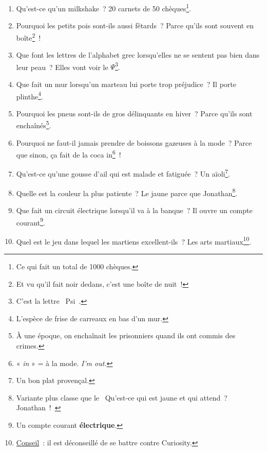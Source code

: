 \documentclass[10pt,a5paper,fullpage]{book}
\begin{document}
\begin{enumerate}
		\item Qu’est-ce qu'un milkshake~? 20 carnets de 50 chèques\footnote{Ce qui fait un total de 1000 chèques.}.
		\item Pourquoi les petits pois sont-ils aussi fêtards~? Parce qu'ils sont souvent en boîte\footnote{Et vu qu’il fait noir dedans, c’est une boîte de nuit~!}~!
		\item Que font les lettres de l’alphabet grec lorsqu’elles ne se sentent pas bien dans leur peau~? Elles vont voir le $\Psi$\footnote{C'est la lettre \guillemotleft~Psi~\guillemotright.}.
		\item Que fait un mur lorsqu’un marteau lui porte trop préjudice~? Il porte plinthe\footnote{L’espèce de frise de carreaux en bas d’un mur. }.
		\item Pourquoi les pneus sont-ils de gros délinquants en hiver~? Parce qu’ils sont enchaînés\footnote{À une époque, on enchaînait les prisonniers quand ils ont commis des crimes.}. 
		\item Pourquoi ne faut-il jamais prendre de boissons gazeuses à la mode~? Parce que sinon, ça fait de la coca in\footnote{« \textit{in} » = à la mode. \textit{I'm out.}}~!
		\item Qu’est-ce qu’une gousse d’ail qui est malade et fatiguée~? Un aïoli\footnote{Un bon plat provençal.}.
		\item Quelle est la couleur la plus patiente~? Le jaune parce que Jonathan\footnote{Variante plus classe que le \guillemotleft~Qu'est-ce qui est jaune et qui attend~? Jonathan~!~\guillemotright}.
		\item Que fait un circuit électrique lorsqu’il va à la banque~? Il ouvre un compte courant\footnote{Un compte courant \textbf{électrique}.}.
		\item Quel est le jeu dans lequel les martiens excellent-ils~? Les arts martiaux\footnote{\underline{Conseil}~: il est déconseillé de se battre contre Curiosity.}.

\end{enumerate}
\end{document}
